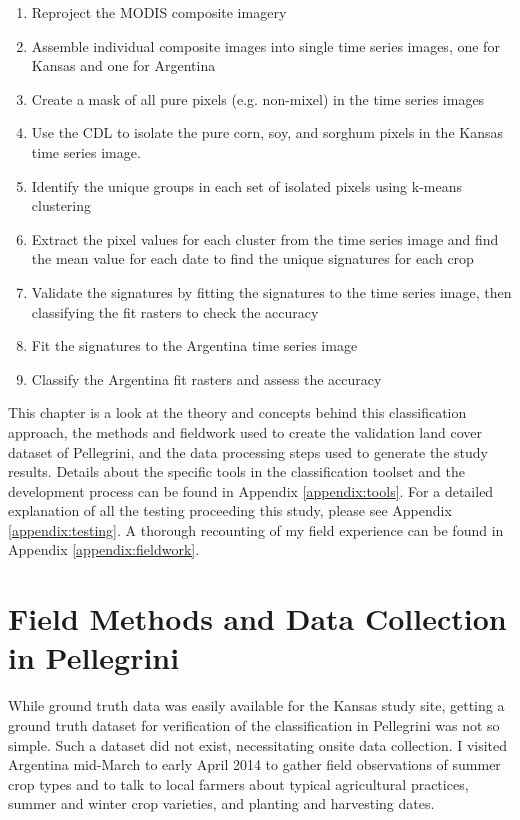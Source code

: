 \begin{Spacing}{1.2}
\begin{enumerate}
  \item Reproject the MODIS composite imagery
  \item Assemble individual composite images into single time series images, one for Kansas and one for Argentina
  \item Create a mask of all pure pixels (e.g. non-mixel) in the time series images
  \item Use the CDL to isolate the pure corn, soy, and sorghum pixels in the Kansas time series image.
  \item Identify the unique groups in each set of isolated pixels using k-means clustering
  \item Extract the pixel values for each cluster from the time series image and find the mean value for each date to find the unique signatures for each crop
  \item Validate the signatures by fitting the signatures to the time series image, then classifying the fit rasters to check the accuracy
  \item Fit the signatures to the Argentina time series image
  \item Classify the Argentina fit rasters and assess the accuracy
\end{enumerate}
\end{Spacing}

This chapter is a look at the theory and concepts behind this classification approach, the methods and fieldwork used to create the validation land cover dataset of Pellegrini, and the data processing steps used to generate the study results. Details about the specific tools in the classification toolset and the development process can be found in Appendix \ref{appendix:tools}. For a detailed explanation of all the testing proceeding this study, please see Appendix \ref{appendix:testing}. A thorough recounting of my field experience can be found in Appendix \ref{appendix:fieldwork}.


\section{Field Methods and Data Collection in Pellegrini}

While ground truth data was easily available for the Kansas study site, getting a ground truth dataset for verification of the classification in Pellegrini was not so simple. Such a dataset did not exist, necessitating onsite data collection. I visited Argentina mid-March to early April 2014 to gather field observations of summer crop types and to talk to local farmers about typical agricultural practices, summer and winter crop varieties, and planting and harvesting dates.

